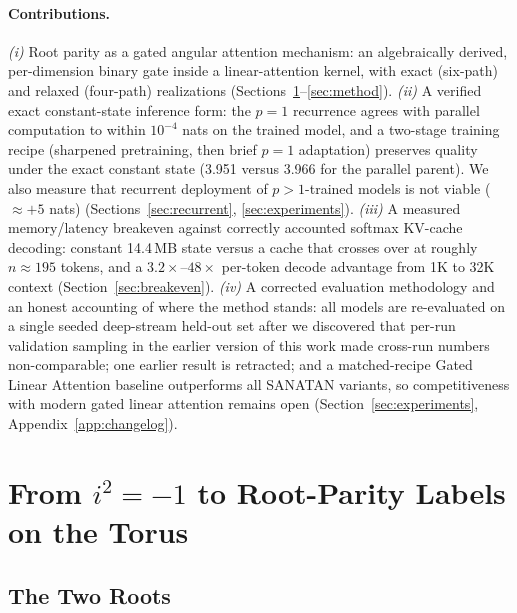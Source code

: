 \documentclass{article}
\begin{document}
\paragraph{Contributions.}
\emph{(i)} Root parity as a gated angular attention mechanism: an algebraically derived, per-dimension binary gate inside a linear-attention kernel, with exact (six-path) and relaxed (four-path) realizations (Sections~\ref{sec:algebra}--\ref{sec:method}).
\emph{(ii)} A verified exact constant-state inference form: the $p{=}1$ recurrence agrees with parallel computation to within $10^{-4}$ nats on the trained model, and a two-stage training recipe (sharpened pretraining, then brief $p{=}1$ adaptation) preserves quality under the exact constant state (3.951 versus 3.966 for the parallel parent). We also measure that recurrent deployment of $p{>}1$-trained models is not viable ($\approx{+}5$ nats) (Sections~\ref{sec:recurrent}, \ref{sec:experiments}).
\emph{(iii)} A measured memory/latency breakeven against correctly accounted softmax KV-cache decoding: constant 14.4\,MB state versus a cache that crosses over at roughly $n \approx 195$ tokens, and a $3.2\times$--$48\times$ per-token decode advantage from 1K to 32K context (Section~\ref{sec:breakeven}).
\emph{(iv)} A corrected evaluation methodology and an honest accounting of where the method stands: all models are re-evaluated on a single seeded deep-stream held-out set after we discovered that per-run validation sampling in the earlier version of this work made cross-run numbers non-comparable; one earlier result is retracted; and a matched-recipe Gated Linear Attention baseline outperforms all SANATAN variants, so competitiveness with modern gated linear attention remains open (Section~\ref{sec:experiments}, Appendix~\ref{app:changelog}).

\section{From $i^2 = -1$ to Root-Parity Labels on the Torus}
\label{sec:algebra}

\subsection{The Two Roots}
\end{document}
